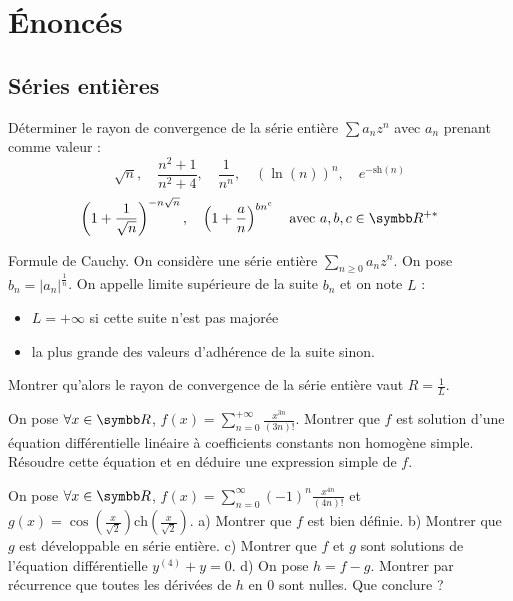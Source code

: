 \section{Énoncés}
\subsection{Séries entières}

\setcounter{numexo}{9}

\begin{exercice}
Déterminer le rayon de convergence de la série entière $\sum a_{n}z^{n}$ avec $a_{n}$ prenant comme valeur : 
$$ \sqrt{n}, \quad \frac{n^{2}+1}{n^{2}+4}, \quad \frac{1}{n^n}, \quad (\ln(n))^{n}, \quad e^{-\mathrm{sh}(n)} $$ 
$$ \left(1+\frac{1}{\sqrt{n}}\right)^{-n\sqrt{n}}, \quad \left(1+\frac{a}{n}\right)^{bn^{c}} \quad \text{avec } a,b,c \in \R^{+*} $$ 
\end{exercice}

\begin{exercice}
Formule de Cauchy. 
On considère une série entière $\sum_{n\ge 0}a_{n}z^{n}$. 
On pose $b_{n}=|a_{n}|^{\frac{1}{n}}$. 
On appelle limite supérieure de la suite $b_{n}$ et on note $L$ : 
\begin{itemize}
 \item $L=+\infty$ si cette suite n'est pas majorée 
 \item la plus grande des valeurs d'adhérence de la suite sinon. 
\end{itemize}
Montrer qu'alors le rayon de convergence de la série entière vaut $R=\frac{1}{L}$. 
\end{exercice}

\begin{exercice}
On pose $\forall x\in\R$, $f(x)=\sum_{n=0}^{+\infty}\frac{x^{3n}}{(3n)!}$. 
Montrer que $f$ est solution d'une équation différentielle linéaire à coefficients constants non homogène simple. 
Résoudre cette équation et en déduire une expression simple de $f$. 
\end{exercice}

\begin{exercice}
On pose $\forall x\in\R$, $f(x)=\sum_{n=0}^{\infty}(-1)^{n}\frac{x^{4n}}{(4n)!}$ et $g(x)=\cos\left(\frac{x}{\sqrt{2}}\right)\mathrm{ch}\left(\frac{x}{\sqrt{2}}\right)$. 
a) Montrer que $f$ est bien définie. 
b) Montrer que $g$ est développable en série entière. 
c) Montrer que $f$ et $g$ sont solutions de l'équation différentielle $y^{(4)}+y=0$. 
d) On pose $h=f-g$. Montrer par récurrence que toutes les dérivées de $h$ en 0 sont nulles. Que conclure ? 
\end{exercice}

